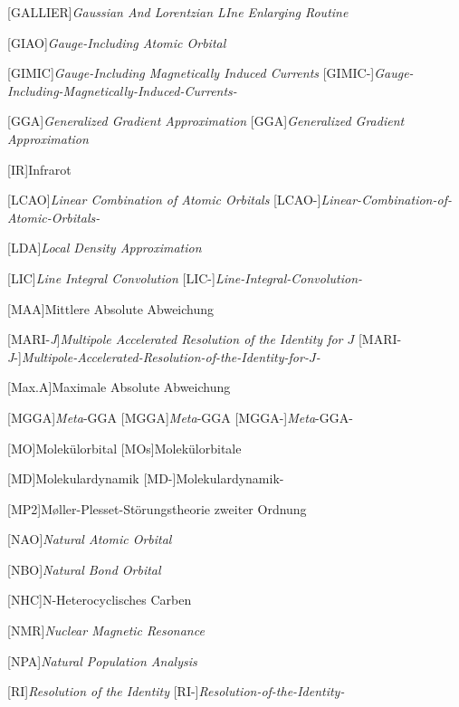 \begin{acronym}[D-COSMO-RS]
	[GALLIER]{\textit{Gaussian And Lorentzian LIne Enlarging Routine}}
	
	[GIAO]{\textit{Gauge-Including Atomic Orbital}}   
	
	[GIMIC]{\textit{Gauge-Including Magnetically Induced Currents}}
	[GIMIC-]{\textit{Gauge-Including-Magnetically-Induced-Currents-}} 

	[GGA]{\textit{Generalized Gradient Approximation}}   
		[GGA]{\textit{Generalized Gradient Approximation}}
	
	[IR]{Infrarot}
		
	[LCAO]{\textit{Linear Combination of Atomic Orbitals}}
	[LCAO-]{\textit{Linear-Combination-of-Atomic-Orbitals-}}
	
	[LDA]{\textit{Local Density Approximation}}
	
	[LIC]{\textit{Line Integral Convolution}}
	[LIC-]{\textit{Line-Integral-Convolution-}}
	
	[MAA]{Mittlere Absolute Abweichung}
     
    [MARI-\textit{J}]{\textit{Multipole Accelerated Resolution of the Identity for $J$}}
    [MARI-\textit{J}-]{\textit{Multipole-Accelerated-Resolution-of-the-Identity-for-$J$-}}
    
    [Max.A]{Maximale Absolute Abweichung} 	
 	
	[MGGA]{\textit{Meta}-GGA}   
		{\textit{Meta}-GGA}
	[MGGA-]{\textit{Meta}-GGA-}		
			
	[MO]{Molekülorbital}   
		[MOs]{Molekülorbitale}
		
	[MD]{Molekulardynamik}
	[MD-]{Molekulardynamik-}
	
	[MP2]{M\o ller-Plesset-Störungstheorie zweiter Ordnung}
		
    [NAO]{\textit{Natural Atomic Orbital}}

    [NBO]{\textit{Natural Bond Orbital}}
    
    [NHC]{N-Heterocyclisches Carben}
    
    [NMR]{\textit{Nuclear Magnetic Resonance}}
        
    [NPA]{\textit{Natural Population Analysis}}
      
    [RI]{\textit{Resolution of the Identity}}
    [RI-]{\textit{Resolution-of-the-Identity-}}
    

\end{acronym}
